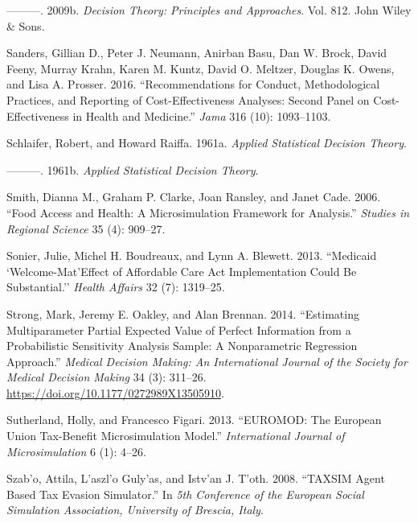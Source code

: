 \documentclass[
  10pt,
]{article}
\begin{document}
\leavevmode\hypertarget{ref-parmigiani_decision_2009}{}%
---------. 2009b. \emph{Decision Theory: Principles and Approaches}.
Vol. 812. John Wiley \& Sons.

\leavevmode\hypertarget{ref-sandersRecommendationsConductMethodological2016}{}%
Sanders, Gillian D., Peter J. Neumann, Anirban Basu, Dan W. Brock, David
Feeny, Murray Krahn, Karen M. Kuntz, David O. Meltzer, Douglas K. Owens,
and Lisa A. Prosser. 2016. ``Recommendations for Conduct, Methodological
Practices, and Reporting of Cost-Effectiveness Analyses: Second Panel on
Cost-Effectiveness in Health and Medicine.'' \emph{Jama} 316 (10):
1093--1103.

\leavevmode\hypertarget{ref-schlaiferAppliedStatisticalDecision1961}{}%
Schlaifer, Robert, and Howard Raiffa. 1961a. \emph{Applied Statistical
Decision Theory}.

\leavevmode\hypertarget{ref-schlaifer_applied_1961}{}%
---------. 1961b. \emph{Applied Statistical Decision Theory}.

\leavevmode\hypertarget{ref-smithFoodAccessHealth2006}{}%
Smith, Dianna M., Graham P. Clarke, Joan Ransley, and Janet Cade. 2006.
``Food Access and Health: A Microsimulation Framework for Analysis.''
\emph{Studies in Regional Science} 35 (4): 909--27.

\leavevmode\hypertarget{ref-SonierMedicaidwelcomemateffect2013}{}%
Sonier, Julie, Michel H. Boudreaux, and Lynn A. Blewett. 2013.
``Medicaid `Welcome-Mat'Effect of Affordable Care Act Implementation
Could Be Substantial.'' \emph{Health Affairs} 32 (7): 1319--25.

\leavevmode\hypertarget{ref-strong_estimating_2014}{}%
Strong, Mark, Jeremy E. Oakley, and Alan Brennan. 2014. ``Estimating
Multiparameter Partial Expected Value of Perfect Information from a
Probabilistic Sensitivity Analysis Sample: A Nonparametric Regression
Approach.'' \emph{Medical Decision Making: An International Journal of
the Society for Medical Decision Making} 34 (3): 311--26.
\url{https://doi.org/10.1177/0272989X13505910}.

\leavevmode\hypertarget{ref-sutherlandEUROMODEuropeanUnion2013a}{}%
Sutherland, Holly, and Francesco Figari. 2013. ``EUROMOD: The European
Union Tax-Benefit Microsimulation Model.'' \emph{International Journal
of Microsimulation} 6 (1): 4--26.

\leavevmode\hypertarget{ref-szaboTAXSIMAgentBased2008}{}%
Szab\a'o, Attila, L\a'aszl\a'o Guly\a'as, and Istv\a'an J. T\a'oth.
2008. ``TAXSIM Agent Based Tax Evasion Simulator.'' In \emph{5th
Conference of the European Social Simulation Association, University of
Brescia, Italy}.
\end{document}
